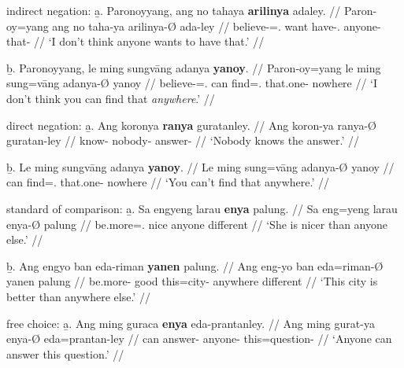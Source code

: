 \a indirect negation:\vspace{.5em} %
	\beginsubsub
	\b{a.} \begingl
		\gla Paronoyyang, ang no tahaya \textbf{arilinya} adaley. //
		\glb Paron-oy=yang ang no taha-ya arilinya-Ø ada-ley //
		\glc believe-\Neg{}=\Fsg{}.\Aarg{} \AgtT{} want 
			have-\Tsg{}.\M{} anyone-\Top{} that-\PargI{} //
		\glft `I don't think anyone wants to have that.' //
		\endgl\vspace{.5em}
	
	\b{b.} \begingl
		\gla Paronoyyang, le ming sungvāng adanya \textbf{yanoy}. //
		\glb Paron-oy=yang le ming sung=vāng adanya-Ø yanoy //
		\glc believe-\Neg{}=\Fsg{}.\Aarg{} \PatTI{} can 
			find=\Ssg{}.\Aarg{} that.one-\Top{} nowhere //
		\glft `I don't think you can find that \emph{anywhere}.' //
		\endgl
	\endsubsub

\a direct negation:\vspace{.5em} %
	\beginsubsub
	\b{a.} \begingl
		\gla Ang koronya \textbf{ranya} guratanley. //
		\glb Ang koron-ya ranya-Ø guratan-ley //
		\glc \AgtT{} know-\TsgM{} nobody-\Top{} answer-\PargI{} //
		\glft `Nobody knows the answer.' //
		\endgl\vspace{.5em}
		
	\b{b.} \begingl
		\gla Le ming sungvāng adanya \textbf{yanoy}. //
		\glb Le ming sung=vāng adanya-Ø yanoy //
		\glc \PatTI{} can find=\Ssg{}.\Aarg{} that.one-\Top{} nowhere //
		\glft `You can't find that anywhere.' //
		\endgl
	\endsubsub

\a standard of comparison:\vspace{.5em} %
	\beginsubsub
	\b{a.} \begingl
		\gla Sa engyeng larau \textbf{enya} palung. //
		\glb Sa eng=yeng larau enya-Ø palung //
		\glc \PatT{} be.more=\TsgF{}.\Aarg{} nice anyone different //
		\glft `She is nicer than anyone else.' //
		\endgl\vspace{.5em}
		
	\b{b.} \begingl
		\gla Ang engyo ban eda-riman \textbf{yanen} palung. //
		\glb Ang eng-yo ban eda=riman-Ø yanen palung //
		\glc \AgtT{} be.more-\TsgN{} good this=city-\Top{} anywhere 
			different //
		\glft `This city is better than anywhere else.' //
		\endgl
	\endsubsub

\a free choice:\vspace{.5em} %
	\beginsubsub
	\b{a.} \begingl
		\gla Ang ming guraca \textbf{enya} eda-prantanley. //
		\glb Ang ming gurat-ya enya-Ø eda=prantan-ley //
		\glc \AgtT{} can answer-\TsgM{} anyone-\Top{} 
				this=question-\PargI{} //
		\glft `Anyone can answer this question.' //
		\endgl\vspace{.5em}
		
